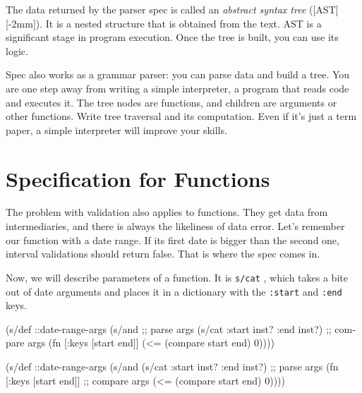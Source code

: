 The data returned by the parser spec is called an \emph{abstract syntax tree} ([AST][-2mm]). It is a nested structure that is obtained from the text. AST is a significant stage in program execution. Once the tree is built, you can use its logic.


Spec also works as a grammar parser: you can parse data and build a tree. You are one step away from writing a simple interpreter, a program that reads code and executes it. The tree nodes are functions, and children are arguments or other functions. Write tree traversal and its computation. Even if it's just a term paper, a simple interpreter will improve your skills.

\section{Specification for Functions}


The problem with validation also applies to functions. They get data from intermediaries, and there is always the likeliness of data error. Let's remember our function with a date range. If its first date is bigger than the second one, interval validations should return false. That is where the spec comes in.

Now, we will describe parameters of a function. It is \verb|s/cat| , which takes a bite out of date arguments and places it in a dictionary with the \verb|:start| and \verb|:end| keys.

\ifx\DEVICETYPE\MOBILE

\begin{english}
  \begin{clojure}
(s/def ::date-range-args
  (s/and
    ;; parse args
    (s/cat :start inst? :end inst?)
    ;; compare args
    (fn [{:keys [start end]}]
      (<= (compare start end) 0))))
  \end{clojure}
\end{english}

\else

\begin{english}
  \begin{clojure}
(s/def ::date-range-args
  (s/and
   (s/cat :start inst? :end inst?) ;; parse args
   (fn [{:keys [start end]}]       ;; compare args
     (<= (compare start end) 0))))
  \end{clojure}
\end{english}

